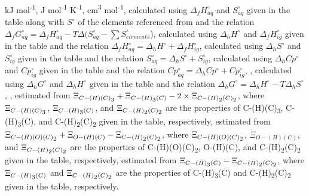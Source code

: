 \begin{landscape}
\begin{table}
\begin{adjustbox}{width=600pt,keepaspectratio}
\begin{threeparttable}
  
  \begin{tablenotes}
     kJ mol\textsuperscript{-1},
     J mol\textsuperscript{-1} K\textsuperscript{-1},
     cm\textsuperscript{3} mol\textsuperscript{-1},
     calculated using $\Delta_{f}H^{\circ}_{aq}$ and $S^{\circ}_{aq}$ given in the table along with $S^{\circ}$ of the elements referenced from \cite{cox1989codata} and the relation $\Delta_{f}G^{\circ}_{aq} = \Delta_{f}H^{\circ}_{aq} - T\Delta(S_{aq}^{\circ}-\sum S_{elements}^{\circ}$),
     calculated using $\Delta_{h}H^{\circ}$ and $\Delta_{f}H^{\circ}_{ig}$ given in the table and the relation $\Delta_{f}H^{\circ}_{aq} = \Delta_{h}H^{\circ} + \Delta_{f}H^{\circ}_{ig}$,
     calculated using $\Delta_{h}S^{\circ}$ and $S^{\circ}_{ig}$ given in the table and the relation $S^{\circ}_{aq} = \Delta_{h}S^{\circ} + S^{\circ}_{ig}$,
     calculated using $\Delta_{h}Cp^{\circ}$ and $Cp^{\circ}_{ig}$ given in the table and the relation $Cp^{\circ}_{aq} = \Delta_{h}Cp^{\circ} + Cp^{\circ}_{ig}$,
     \cite{plyasunov2004group},
     calculated using $\Delta_{h}G^{\circ}$ and $\Delta_{h}H^{\circ}$ given in the table and the relation $\Delta_{h}G^{\circ} = \Delta_{h}H^{\circ} - T\Delta_{h} S^{\circ}$,
     \cite{domalski1993estimation},
     estimated from $\Xi_{C-(H)(C)\textsubscript{3}} + \Xi_{C-(H)\textsubscript{3}(C)} - 2\times\Xi_{C-(H)\textsubscript{2}(C)\textsubscript{2}}$, where $\Xi_{C-(H)(C)\textsubscript{3}}$, $\Xi_{C-(H)\textsubscript{3}(C)}$, and $\Xi_{C-(H)\textsubscript{2}(C)\textsubscript{2}}$ are the properties of C-(H)(C)\textsubscript{3}, C-(H)\textsubscript{3}(C), and C-(H)\textsubscript{2}(C)\textsubscript{2} given in the table, respectively,
     estimated from $\Xi_{C-(H)(O)(C)\textsubscript{2}} + \Xi_{O-(H)(C)} - \Xi_{C-(H)\textsubscript{2}(C)\textsubscript{2}}$, where $\Xi_{C-(H)(O)(C)\textsubscript{2}}$, $\Xi_{O-(H)(C)}$, and $\Xi_{C-(H)\textsubscript{2}(C)\textsubscript{2}}$ are the properties of C-(H)(O)(C)\textsubscript{2}, O-(H)(C), and C-(H)\textsubscript{2}(C)\textsubscript{2} given in the table, respectively,
      estimated from $\Xi_{C-(H)\textsubscript{3}(C)} - \Xi_{C-(H)\textsubscript{2}(C)\textsubscript{2}}$, where $\Xi_{C-(H)\textsubscript{3}(C)}$ and $\Xi_{C-(H)\textsubscript{2}(C)\textsubscript{2}}$ are the properties of C-(H)\textsubscript{3}(C) and C-(H)\textsubscript{2}(C)\textsubscript{2} given in the table, respectively.
    
        
  \end{tablenotes}
  
  \label{tab:grpadd_chain}
  \end{threeparttable}
  \end{adjustbox}
\end{table}

\end{landscape}
